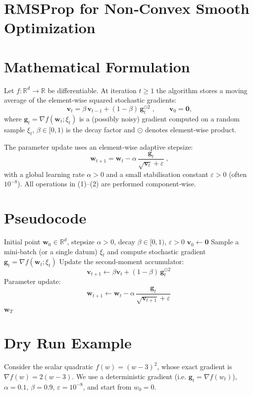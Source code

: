 \documentclass{article}
\newcommand{\RR}{\mathbb{R}}
\begin{document}
\section*{RMSProp for Non‑Convex Smooth Optimization}

\section*{Mathematical Formulation}
Let $f:\RR^{d}\rightarrow\RR$ be differentiable.  
At iteration $t\ge 1$ the algorithm stores a moving average of the element‑wise squared stochastic gradients:
\[
\boxed{\;\bm v_{t}= \beta \,\bm v_{t-1} + (1-\beta)\,\bm g_{t}^{\odot 2}\;},
\qquad \bm v_{0}= \mathbf 0,
\tag{1}
\]
where $\bm g_{t}= \nabla f(\bm w_{t};\xi_{t})$ is a (possibly noisy) gradient computed on a random sample $\xi_{t}$, $\beta\in[0,1)$ is the decay factor and $\odot$ denotes element‑wise product.  

The parameter update uses an element‑wise adaptive stepsize:
\[
\boxed{\;\bm w_{t+1}= \bm w_{t} - \alpha \,
\frac{\bm g_{t}}{\sqrt{\bm v_{t}}+\varepsilon}\;},
\tag{2}
\]
with a global learning rate $\alpha>0$ and a small stabilisation constant $\varepsilon>0$ (often $10^{-8}$).  
All operations in (1)–(2) are performed component‑wise.

\section*{Pseudocode}
\begin{algorithm}[H]
\caption{RMSProp (non‑convex version)}\label{alg:rmsprop}
\begin{algorithmic}[1]
\REQUIRE Initial point $\bm w_{0}\in\RR^{d}$, stepsize $\alpha>0$, decay $\beta\in[0,1)$, $\varepsilon>0$
\STATE $\bm v_{0}\gets \mathbf 0$
    \STATE Sample a mini‑batch (or a single datum) $\xi_{t}$ and compute stochastic gradient 
    $\bm g_{t}= \nabla f(\bm w_{t};\xi_{t})$
    \STATE Update the second‑moment accumulator:
    \[
    \bm v_{t+1}\gets \beta \bm v_{t} + (1-\beta)\,\bm g_{t}^{\odot 2}
    \]
    \STATE Parameter update:
    \[
    \bm w_{t+1}\gets \bm w_{t} - \alpha\,
    \frac{\bm g_{t}}{\sqrt{\bm v_{t+1}}+\varepsilon}
    \]
\ENDFOR
\RETURN $\bm w_{T}$
\end{algorithmic}
\end{algorithm}

\section*{Dry Run Example}
Consider the scalar quadratic $f(w)=(w-3)^{2}$, whose exact gradient is $\nabla f(w)=2(w-3)$.  
We use a deterministic gradient (i.e. $\bm g_{t}= \nabla f(w_{t})$), $\alpha=0.1$, $\beta=0.9$, $\varepsilon=10^{-8}$, and start from $w_{0}=0$.  
\end{document}
